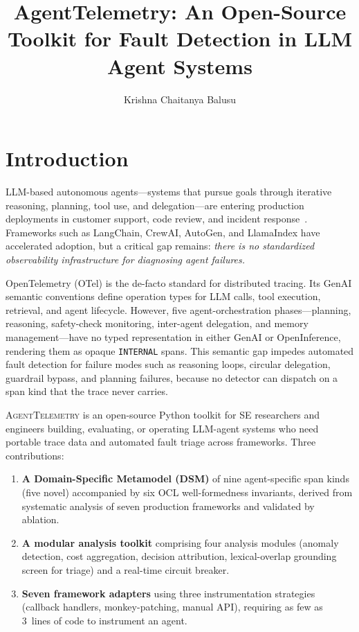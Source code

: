 \documentclass[sigconf,review]{acmart}
\title{AgentTelemetry: An Open-Source Toolkit for Fault Detection in LLM Agent Systems}
\author{Krishna Chaitanya Balusu}
\affiliation{%
  \institution{Independent Researcher}
  \country{United States}
}
\begin{document}
\maketitle

\sloppy

\section{Introduction}
\label{sec:intro}

LLM-based autonomous agents---systems that pursue goals through
iterative reasoning, planning, tool use, and delegation---are entering
production deployments in customer support, code review, and incident
response~\cite{cemri2025multiagent}.
Frameworks such as LangChain, CrewAI, AutoGen, and LlamaIndex have
accelerated adoption, but a critical gap remains: \emph{there is no
standardized observability infrastructure for diagnosing agent
failures.}

OpenTelemetry (OTel) is the de-facto standard for distributed tracing.
Its GenAI semantic conventions define operation types for LLM calls,
tool execution, retrieval, and agent lifecycle.  However, five
agent-orchestration phases---planning, reasoning, safety-check
monitoring, inter-agent delegation, and memory management---have no
typed representation in either GenAI or OpenInference, rendering them
as opaque \texttt{INTERNAL} spans.  This semantic gap impedes
automated fault detection for failure modes such as reasoning loops,
circular delegation, guardrail bypass, and planning failures, because
no detector can dispatch on a span kind that the trace never carries.

\textsc{AgentTelemetry} is an open-source Python toolkit for SE
researchers and engineers building, evaluating, or operating LLM-agent
systems who need portable trace data and automated fault triage across
frameworks.  Three contributions:

\begin{enumerate}[leftmargin=*,nosep]
\item \textbf{A Domain-Specific Metamodel (DSM)} of nine agent-specific
  span kinds (five novel) accompanied by six OCL well-formedness
  invariants, derived from systematic analysis of seven production
  frameworks and validated by ablation.
\item \textbf{A modular analysis toolkit} comprising four analysis
  modules (anomaly detection, cost aggregation, decision attribution,
  lexical-overlap grounding screen for triage) and a real-time circuit
  breaker.
\item \textbf{Seven framework adapters} using three instrumentation
  strategies (callback handlers, monkey-patching, manual API),
  requiring as few as 3~lines of code to instrument an agent.
\end{enumerate}
\end{document}
